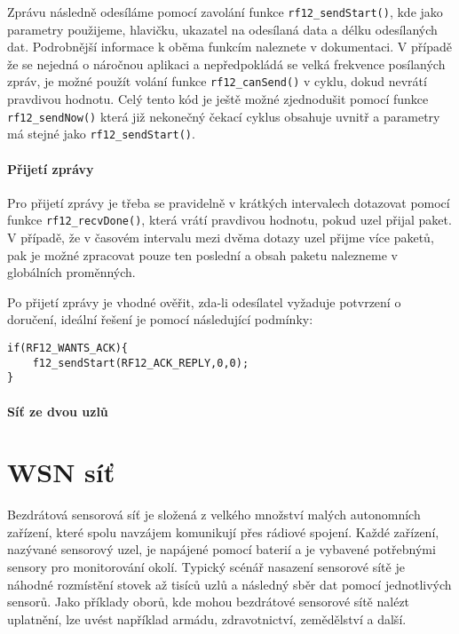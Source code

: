 \documentclass[12pt,titlepage]{article}
\begin{document}
		Zprávu následně odesíláme pomocí zavolání funkce \texttt{rf12\_sendStart()}, kde jako parametry použijeme, hlavičku, ukazatel na odesílaná data a délku odesílaných dat. Podrobnější informace k oběma funkcím naleznete v dokumentaci. V případě že se nejedná o náročnou aplikaci a nepředpokládá se velká frekvence posílaných zpráv, je možné použít volání funkce \texttt{rf12\_canSend()} v cyklu, dokud nevrátí pravdivou hodnotu. Celý tento kód je ještě možné zjednodušit pomocí funkce \texttt{rf12\_sendNow()} která již nekonečný čekací cyklus obsahuje uvnitř a parametry má stejné jako \texttt{rf12\_sendStart()}. 
		
		\paragraph{Přijetí zprávy}
		Pro přijetí zprávy je třeba se pravidelně v krátkých intervalech dotazovat pomocí funkce \texttt{rf12\_recvDone()}, která vrátí pravdivou hodnotu, pokud uzel přijal paket. V případě, že v časovém intervalu mezi dvěma dotazy uzel přijme více paketů, pak je možné zpracovat pouze ten poslední a obsah paketu nalezneme v globálních proměnných. 
		
		Po přijetí zprávy  je vhodné ověřit, zda-li odesílatel vyžaduje potvrzení o doručení, ideální řešení je pomocí následující podmínky:
		
\begin{verbatim}
if(RF12_WANTS_ACK){
    f12_sendStart(RF12_ACK_REPLY,0,0);
}
\end{verbatim}
		
		
		
	
	
		\paragraph{Síť ze dvou uzlů}
	
\section{WSN síť}

	Bezdrátová sensorová síť je složená z velkého množství malých autonomních zařízení, které spolu navzájem komunikují přes rádiové spojení. Každé zařízení, nazývané sensorový uzel, je napájené pomocí 	baterií a je vybavené potřebnými sensory pro monitorování okolí. Typický scénář nasazení sensorové sítě je náhodné rozmístění stovek až tisíců uzlů a následný sběr dat pomocí jednotlivých sensorů. Jako příklady oborů, kde mohou bezdrátové sensorové sítě nalézt uplatnění, lze uvést například armádu, zdravotnictví, zemědělství a další.
	
\end{document}

